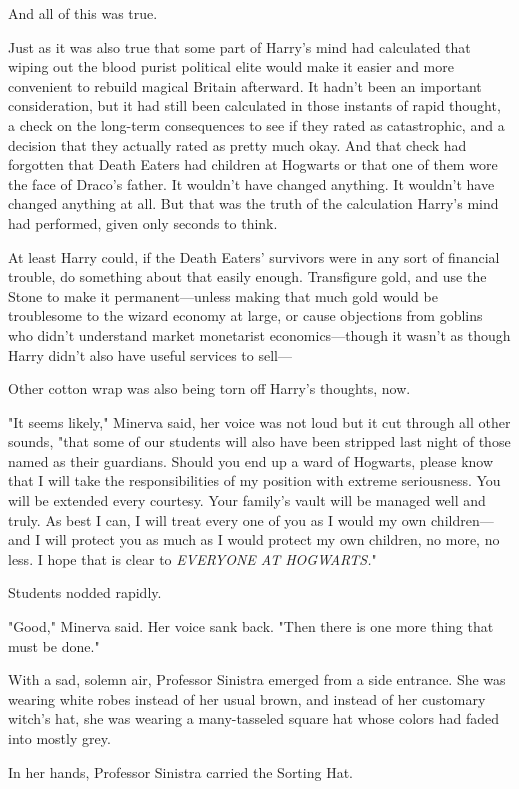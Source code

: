 And all of this was true.

Just as it was also true that some part of Harry's mind had calculated that
wiping out the blood purist political elite would make it easier and more
convenient to rebuild magical Britain afterward. It hadn't been an important
consideration, but it had still been calculated in those instants of rapid
thought, a check on the long-term consequences to see if they rated as
catastrophic, and a decision that they actually rated as pretty much okay. And
that check had forgotten that Death Eaters had children at Hogwarts or that one
of them wore the face of Draco's father. It wouldn't have changed anything. It
wouldn't have changed anything at all. But that was the truth of the
calculation Harry's mind had performed, given only seconds to think.

At least Harry could, if the Death Eaters' survivors were in any sort of
financial trouble, do something about that easily enough. Transfigure gold, and
use the Stone to make it permanent—unless making that much gold would be
troublesome to the wizard economy at large, or cause objections from goblins
who didn't understand market monetarist economics—though it wasn't as though
Harry didn't also have useful services to sell—

Other cotton wrap was also being torn off Harry's thoughts, now.

"It seems likely," Minerva said, her voice was not loud but it cut through all
other sounds, "that some of our students will also have been stripped last
night of those named as their guardians. Should you end up a ward of Hogwarts,
please know that I will take the responsibilities of my position with extreme
seriousness. You will be extended every courtesy. Your family's vault will be
managed well and truly. As best I can, I will treat every one of you as I would
my own children—and I will protect you as much as I would protect my own
children, no more, no less. I hope that is clear to \emph{EVERYONE AT
HOGWARTS.}"

Students nodded rapidly.

"Good," Minerva said. Her voice sank back. "Then there is one more thing that
must be done."

With a sad, solemn air, Professor Sinistra emerged from a side entrance. She
was wearing white robes instead of her usual brown, and instead of her
customary witch's hat, she was wearing a many-tasseled square hat whose colors
had faded into mostly grey.

In her hands, Professor Sinistra carried the Sorting Hat.

